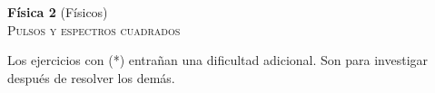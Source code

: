 \documentclass[11pt,spanish,a4paper]{article}
\begin{document}
\begin{center}
\textbf{Física 2} (Físicos) \hfill {}\\
	\textsc{\LARGE Pulsos y espectros cuadrados}
\end{center}

Los ejercicios con (*) entrañan una dificultad adicional. Son para investigar después de resolver los demás.




\begin{enumerate}


}



\end{enumerate}
\end{document}
